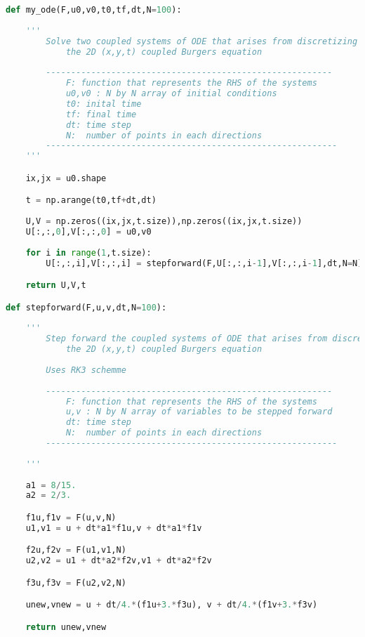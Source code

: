 \documentclass[11pt]{article}
\begin{document}
\begin{lstlisting}[language=Python]
def my_ode(F,u0,v0,t0,tf,dt,N=100):
    
    '''
        Solve two coupled systems of ODE that arises from discretizing
            the 2D (x,y,t) coupled Burgers equation
            
        ---------------------------------------------------------
            F: function that represents the RHS of the systems
            u0,v0 : N by N array of initial conditions
            t0: inital time
            tf: final time
            dt: time step
            N:  number of points in each directions 
        ----------------------------------------------------------
    '''

    ix,jx = u0.shape

    t = np.arange(t0,tf+dt,dt)
    
    U,V = np.zeros((ix,jx,t.size)),np.zeros((ix,jx,t.size))
    U[:,:,0],V[:,:,0] = u0,v0
    
    for i in range(1,t.size):
        U[:,:,i],V[:,:,i] = stepforward(F,U[:,:,i-1],V[:,:,i-1],dt,N=N)

    return U,V,t

def stepforward(F,u,v,dt,N=100):
    
    '''
        Step forward the coupled systems of ODE that arises from discretizing
            the 2D (x,y,t) coupled Burgers equation
            
        Uses RK3 schemme    
            
        ---------------------------------------------------------
            F: function that represents the RHS of the systems
            u,v : N by N array of variables to be stepped forward
            dt: time step
            N:  number of points in each directions 
        ----------------------------------------------------------
      
    '''
    
    a1 = 8/15.
    a2 = 2/3.

    f1u,f1v = F(u,v,N)
    u1,v1 = u + dt*a1*f1u,v + dt*a1*f1v

    f2u,f2v = F(u1,v1,N)
    u2,v2 = u1 + dt*a2*f2v,v1 + dt*a2*f2v

    f3u,f3v = F(u2,v2,N)

    unew,vnew = u + dt/4.*(f1u+3.*f3u), v + dt/4.*(f1v+3.*f3v)

    return unew,vnew
\end{lstlisting}
\end{document}
